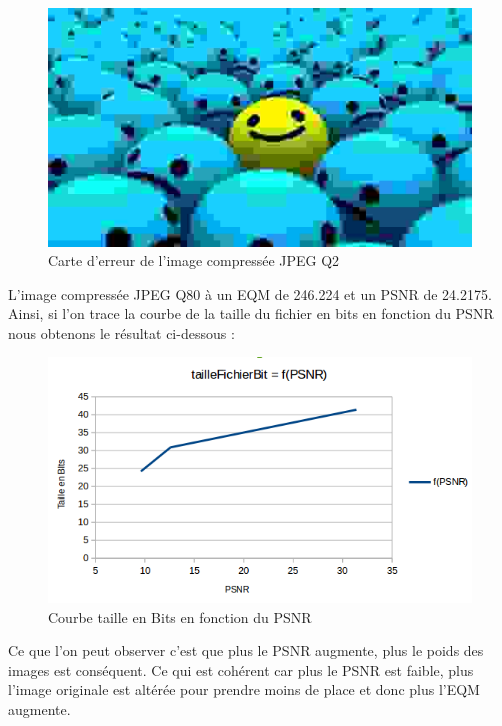\documentclass[12pt]{report}
\begin{document}
\begin{figure}[H]
\begin{center}
\includegraphics[scale=0.5]{../smileyDegQ2.jpg} 
\caption{Carte d'erreur de l'image compressée JPEG Q2 }
\end{center}
\end{figure}

L'image compressée JPEG Q80 à un EQM de 246.224 et un PSNR de 24.2175.\\

Ainsi, si l'on trace la courbe de la taille du fichier en bits en fonction du PSNR nous obtenons le résultat ci-dessous :

\begin{figure}[H]
\begin{center}
\includegraphics[scale=0.8]{../ImageRes/f(PSNR).png} 
\caption{Courbe taille en Bits en fonction du PSNR }
\end{center}
\end{figure}

Ce que l'on peut observer c'est que plus le PSNR augmente, plus le poids des images est conséquent. Ce qui est cohérent car plus le PSNR est faible, plus l'image originale est altérée pour prendre moins de place et donc plus l'EQM augmente.
\end{document}
